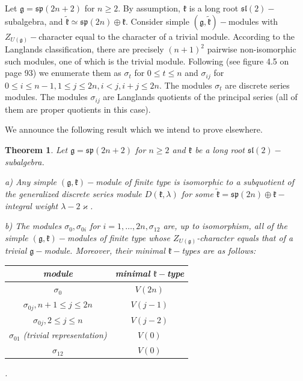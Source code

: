 \documentclass[10pt]{amsart}
\newtheorem{theo}{Theorem}[section]
\renewcommand{\gg}{\mathfrak{g}}
\newcommand{\kk}{\mathfrak{k}}
\renewcommand{\sp}{\mathfrak{sp}}
\renewcommand{\sl}{\mathfrak{sl}}
\begin{document}
Let $\gg = \sp(2n+2)$ for $n \geq 2$. By assumption, $\kk$ is a long root $\sl(2)-$subalgebra, and $\tilde{\kk} \simeq \sp(2n)\oplus\kk$. Consider simple $(\gg,\tilde{\kk})-$modules with $Z_{U(\gg)}-$character equal to the character of a trivial module. According to the Langlands classification, there are precisely $(n+1)^2$ pairwise non-isomorphic such modules, one of which is the trivial module. Following \cite{Co} (see figure 4.5 on page 93) we enumerate them as $\sigma_{t}$ for $0 \leq t \leq n$ and $\sigma_{ij}$ for $0 \leq i \leq n-1, 1 \leq j \leq 2n, i < j, i+j \leq 2n$. The modules $\sigma_t$ are discrete series modules. The modules $\sigma_{ij}$ are Langlands quotients of the principal series (all of them are proper quotients in this case).

We announce the following result which we intend to prove elsewhere.

\begin{theo}\label{th:6}
 Let $\gg = \sp(2n+2)$ for $n \geq 2$ and $\kk$ be a long root $\sl(2)-$subalgebra.
 
 a) Any simple $(\gg,\kk)-$module of finite type is isomorphic to a subquotient of the generalized discrete series module $D(\kk,\lambda)$ for some $\tilde{\kk} = \sp (2n)\oplus\kk-$integral weight $\lambda - 2\varkappa$.
 
 b) The modules $\sigma_0, \sigma_{0i}$ for $i = 1, \dots,2n,\sigma_{12}$ are, up to isomorphism, all of the simple $(\gg,\kk)-$modules of finite type whose $Z_{U(\gg)}$-character equals that of a trivial $\gg-$module. Moreover, their minimal $\kk-$types are as follows:
 \begin{center}
\begin{tabular}{|c|c|}\hline
\textbf{module} & \textbf{minimal $\kk-$type}\\\hline
$\sigma_0$ & $V(2n)$\\\hline
$\sigma_{0j}, n+1 \leq j \leq 2n$ & $V(j-1)$\\\hline
$\sigma_{0j}, 2 \leq j \leq n$ & $V(j-2)$\\\hline
$\sigma_{01}$ (trivial representation) & $V(0)$\\\hline
$\sigma_{12}$ & $V(0)$\\\hline
\end{tabular}\hspace{0.2cm}.
\end{center}
\end{theo}

\newpage
\end{document}
